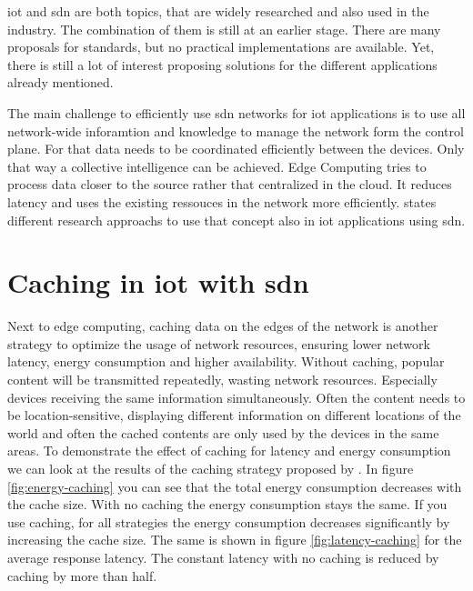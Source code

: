 \documentclass[conference]{IEEEtran}
\begin{document}
	\ac{iot} and \ac{sdn} are both topics, that are widely researched and also used in the industry. The combination of them is still at an earlier stage. There are many proposals for standards, but no practical implementations are available. Yet, there is still a lot of interest proposing solutions for the different applications already mentioned. \cite{Manguri2022-vp} 

	The main challenge to efficiently use \ac{sdn} networks for \ac{iot} applications is to use all network-wide inforamtion and knowledge to manage the network form the control plane. For that data needs to be coordinated efficiently between the devices. Only that way a collective intelligence can be achieved. Edge Computing tries to process data closer to the source rather that centralized in the cloud. It reduces latency and uses the existing ressouces in the network more efficiently. \cite{edge-computing} \citeauthor{Li2020-lx} states different research approachs to use that concept also in \ac{iot} applications using \ac{sdn}. 

	






	\cite{8777339} \cite{Sahrish2017}

	\section{Caching in \ac{iot} with \ac{sdn}}
	\label{sec:caching}

	Next to edge computing, caching data on the edges of the network is another strategy to optimize the usage of network resources, ensuring lower network latency, energy consumption and higher availability. \cite{caching-1} \cite{caching-2} \cite{caching-4} Without caching, popular content will be transmitted repeatedly, wasting network resources. Especially devices receiving the same information simultaneously. Often the content needs to be location-sensitive, displaying different information on different locations of the world and often the cached contents are only used by the devices in the same areas. To demonstrate the effect of caching  for latency and energy consumption we can look at the results of the caching strategy proposed by \cite{caching-1}. In figure \ref{fig:energy-caching} you can see that the total energy consumption decreases with the cache size. With no caching the energy consumption stays the same. If you use caching, for all strategies the energy consumption decreases significantly by increasing the cache size. The same is shown in figure \ref{fig:latency-caching} for the average response latency. The constant latency with no caching is reduced by caching by more than half.
\end{document}
